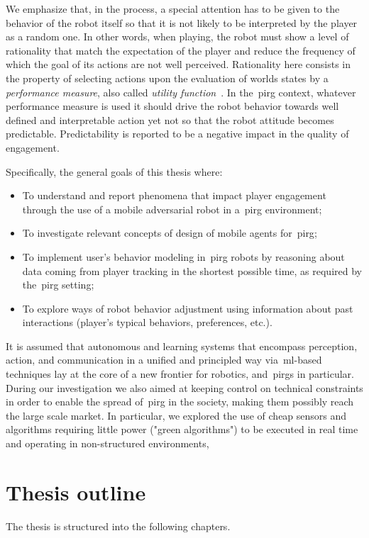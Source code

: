 We emphasize that, in the process, a special attention has to be given to the behavior of the robot itself so that it is not likely to be interpreted by the player as a random one. In other words, when playing, the robot must show a level of rationality that match the expectation of the player and reduce the frequency of which the goal of its actions are not well perceived. Rationality here consists in the property of selecting actions upon the evaluation of worlds states by a \textit{performance measure}, also called \textit{utility function}~\citep{russell_artificial_2009}. In the~\gls{pirg} context, whatever performance measure is used it should drive the robot behavior towards well defined and interpretable action yet not so that the robot attitude becomes predictable. Predictability is reported to be a negative impact in the quality of engagement.   

Specifically, the general goals of this thesis where:

\begin{itemize}
\item To understand and report phenomena that impact player engagement through the use of a mobile adversarial robot in a~\gls{pirg} environment;
\item To investigate relevant concepts of design of mobile agents for~\gls{pirg};
\item To implement user's behavior modeling in~\gls{pirg} robots by reasoning about data coming from player tracking in the shortest possible time, as required by the~\gls{pirg} setting;
\item To explore ways of robot behavior adjustment using information about past interactions (player's typical behaviors, preferences, etc.).
\end{itemize}

It is assumed that autonomous and learning systems that encompass perception, action, and communication in a unified and principled way via~\gls{ml}-based techniques lay at the core of a new frontier for robotics, and~\gls{pirg}s in particular. During our investigation we also aimed at keeping control on technical constraints in order to enable the spread of~\gls{pirg} in the society, making them possibly reach the large scale market. In particular, we explored the use of cheap sensors and algorithms requiring little power ("green algorithms") to be executed in real time and operating in non-structured environments, 

\section{Thesis outline}
The thesis is structured into the following chapters.

